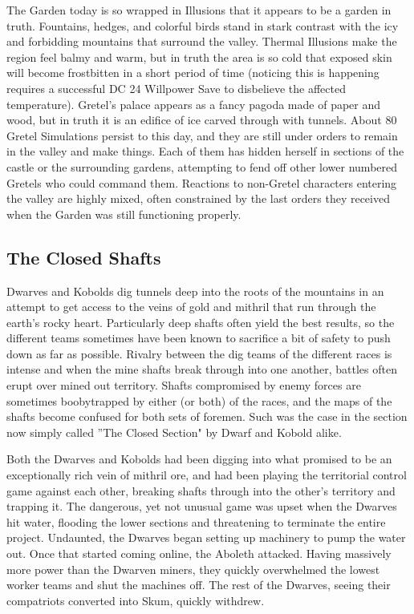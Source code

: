 The Garden today is so wrapped in Illusions that it appears to be a garden in truth. Fountains, hedges, and colorful birds stand in stark contrast with the icy and forbidding mountains that surround the valley. Thermal Illusions make the region feel balmy and warm, but in truth the area is so cold that exposed skin will become frostbitten in a short period of time (noticing this is happening requires a successful DC 24 Willpower Save to disbelieve the affected temperature). Gretel's palace appears as a fancy pagoda made of paper and wood, but in truth it is an edifice of ice carved through with tunnels. About 80 Gretel Simulations persist to this day, and they are still under orders to remain in the valley and make things. Each of them has hidden herself in sections of the castle or the surrounding gardens, attempting to fend off other lower numbered Gretels who could command them. Reactions to non-Gretel characters entering the valley are highly mixed, often constrained by the last orders they received when the Garden was still functioning properly.

\subsection{The Closed Shafts}

Dwarves and Kobolds dig tunnels deep into the roots of the mountains in an attempt to get access to the veins of gold and mithril that run through the earth's rocky heart. Particularly deep shafts often yield the best results, so the different teams sometimes have been known to sacrifice a bit of safety to push down as far as possible. Rivalry between the dig teams of the different races is intense and when the mine shafts break through into one another, battles often erupt over mined out territory. Shafts compromised by enemy forces are sometimes boobytrapped by either (or both) of the races, and the maps of the shafts become confused for both sets of foremen. Such was the case in the section now simply called ''The Closed Section" by Dwarf and Kobold alike.

Both the Dwarves and Kobolds had been digging into what promised to be an exceptionally rich vein of mithril ore, and had been playing the territorial control game against each other, breaking shafts through into the other's territory and trapping it. The dangerous, yet not unusual game was upset when the Dwarves hit water, flooding the lower sections and threatening to terminate the entire project. Undaunted, the Dwarves began setting up machinery to pump the water out. Once that started coming online, the Aboleth attacked. Having massively more power than the Dwarven miners, they quickly overwhelmed the lowest worker teams and shut the machines off. The rest of the Dwarves, seeing their compatriots converted into Skum, quickly withdrew.

